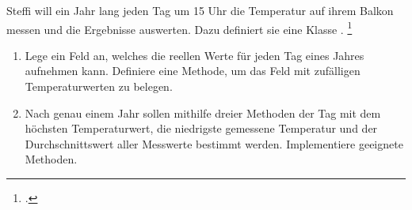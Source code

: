 \documentclass{bschlangaul-aufgabe}
\begin{document}

Steffi will ein Jahr lang jeden Tag um 15 Uhr die Temperatur auf ihrem
Balkon messen und die Ergebnisse auswerten. Dazu definiert sie eine
Klasse .
\footcite[Seite 61, Klett, Informatik 3, S. 68]{oomup:fs:3}
\begin{enumerate}


\item Lege ein Feld  an, welches die reellen Werte für
jeden Tag eines Jahres aufnehmen kann. Definiere eine Methode, um das
Feld mit zufälligen Temperaturwerten zu belegen.


\item Nach genau einem Jahr sollen mithilfe dreier Methoden der Tag mit
dem höchsten Temperaturwert, die niedrigste gemessene Temperatur und der
Durchschnittswert aller Messwerte bestimmt werden. Implementiere
geeignete Methoden.

\begin{bAntwort}
\end{bAntwort}

\end{enumerate}
\end{document}
